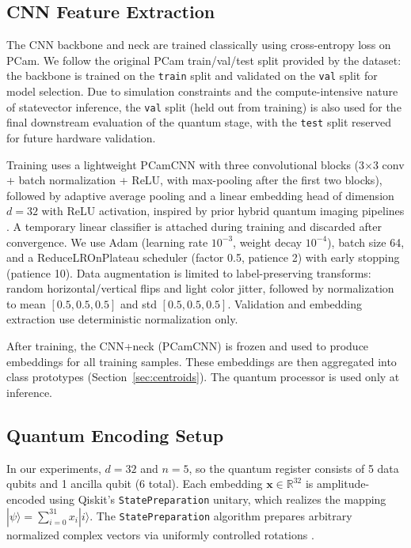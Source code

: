 \documentclass[conference]{IEEEtran}
\begin{document}
\subsection{CNN Feature Extraction}
The CNN backbone and neck are trained classically using cross-entropy loss on PCam. We follow the original PCam train/val/test split provided by the dataset: the backbone is trained on the \texttt{train} split and validated on the \texttt{val} split for model selection. Due to simulation constraints and the compute-intensive nature of statevector inference, the \texttt{val} split (held out from training) is also used for the final downstream evaluation of the quantum stage, with the \texttt{test} split reserved for future hardware validation.

Training uses a lightweight PCamCNN with three convolutional blocks (3$\times$3 conv + batch normalization + ReLU, with max-pooling after the first two blocks), followed by adaptive average pooling and a linear embedding head of dimension $d=32$ with ReLU activation, inspired by prior hybrid quantum imaging pipelines \cite{pcam_01,pcam_03}. A temporary linear classifier is attached during training and discarded after convergence. We use Adam (learning rate $10^{-3}$, weight decay $10^{-4}$), batch size 64, and a ReduceLROnPlateau scheduler (factor 0.5, patience 2) with early stopping (patience 10). Data augmentation is limited to label-preserving transforms: random horizontal/vertical flips and light color jitter, followed by normalization to mean $[0.5,0.5,0.5]$ and std $[0.5,0.5,0.5]$. Validation and embedding extraction use deterministic normalization only.

After training, the CNN+neck (PCamCNN) is frozen and used to produce embeddings for all training samples. These embeddings are then aggregated into class prototypes (Section~\ref{sec:centroids}). The quantum processor is used only at inference.

\subsection{Quantum Encoding Setup}
In our experiments, $d = 32$ and $n = 5$, so the quantum register consists of 5 data qubits and 1 ancilla qubit (6 total). Each embedding $\mathbf{x} \in \mathbb{R}^{32}$ is amplitude-encoded using Qiskit's \texttt{StatePreparation} unitary, which realizes the mapping $|\psi\rangle = \sum_{i=0}^{31} x_i|i\rangle$. The \texttt{StatePreparation} algorithm prepares arbitrary normalized complex vectors via uniformly controlled rotations \cite{plesch2011quantum}.
\end{document}
